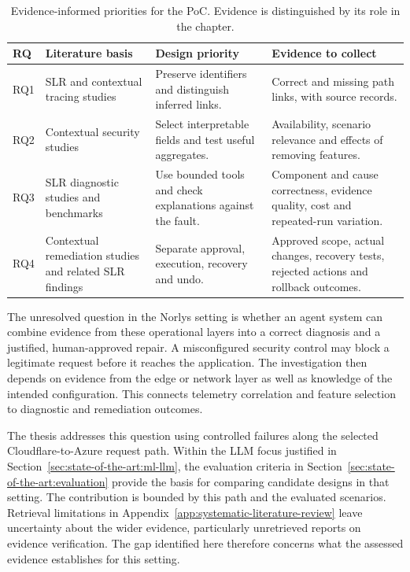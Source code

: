 \begin{table}[htbp]
\centering
\small
\caption{Evidence-informed priorities for the PoC. Evidence is distinguished by its role in the chapter.}
\label{tab:sota:implications}
\begin{tabularx}{\textwidth}{@{}p{}p{}XX@{}}
\toprule
RQ & Literature basis & Design priority & Evidence to collect \\
\midrule
RQ1 & SLR and contextual tracing studies & Preserve identifiers and distinguish inferred links. & Correct and missing path links, with source records. \\
RQ2 & Contextual security studies & Select interpretable fields and test useful aggregates. & Availability, scenario relevance and effects of removing features. \\
RQ3 & SLR diagnostic studies and benchmarks & Use bounded tools and check explanations against the fault. & Component and cause correctness, evidence quality, cost and repeated-run variation. \\
RQ4 & Contextual remediation studies and related SLR findings & Separate approval, execution, recovery and undo. & Approved scope, actual changes, recovery tests, rejected actions and rollback outcomes. \\
\bottomrule
\end{tabularx}
\end{table}

The unresolved question in the Norlys setting is whether an agent system
can combine evidence from these operational layers into a correct diagnosis
and a justified, human-approved repair. A misconfigured security control
may block a legitimate request before it reaches the application. The
investigation then depends on evidence from the edge or network layer as
well as knowledge of the intended configuration. This connects telemetry
correlation and feature selection to diagnostic and remediation outcomes.

The thesis addresses this question using controlled failures along the
selected Cloudflare-to-Azure request path. Within the LLM focus justified
in Section~\ref{sec:state-of-the-art:ml-llm}, the evaluation criteria in
Section~\ref{sec:state-of-the-art:evaluation} provide the basis for comparing
candidate designs in that setting. The contribution is bounded by this
path and the evaluated scenarios. Retrieval limitations in
Appendix~\ref{app:systematic-literature-review} leave uncertainty about the
wider evidence, particularly unretrieved reports on evidence verification.
The gap identified here therefore concerns what the assessed evidence
establishes for this setting.
